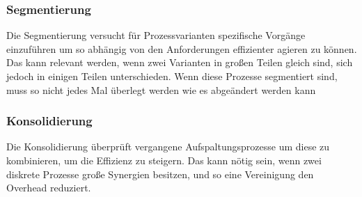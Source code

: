 \documentclass{article}
\begin{document}
  \subsubsection{Segmentierung}
  Die Segmentierung versucht für Prozessvarianten spezifische Vorgänge einzuführen um so abhängig von den Anforderungen effizienter agieren zu können. Das kann relevant werden, wenn zwei Varianten in großen Teilen gleich sind, sich jedoch in einigen Teilen unterschieden. Wenn diese Prozesse segmentiert sind, muss so nicht jedes Mal überlegt werden wie es abgeändert werden kann
  \subsubsection{Konsolidierung}
  Die Konsolidierung überprüft vergangene Aufspaltungsprozesse um diese zu kombinieren, um die Effizienz zu steigern. Das kann nötig sein, wenn zwei diskrete Prozesse große Synergien besitzen, und so eine Vereinigung den Overhead reduziert.





















  
\end{document}
